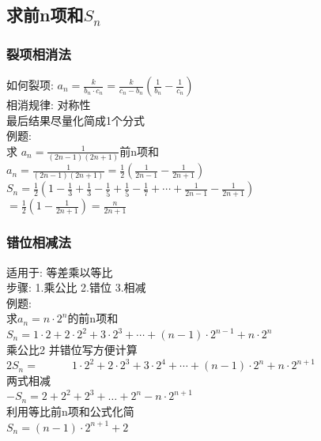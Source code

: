 \documentclass[hyperref, UTF8,11pt,a4paper]{ctexart} %
\begin{document}

\subsection{求前n项和\texorpdfstring{$S_{n}$}{Lg}}


\subsubsection{裂项相消法}

如何裂项: $a_{n}=\frac{k}{b_{n} \cdot c_{n}}=\frac{k}{c_{n}-b_{n}}\left(\frac{1}{b_{n}}-\frac{1}{c_{n}}\right)$ \\
相消规律: 对称性 \\
最后结果尽量化简成1个分式 \\

例题: \\
{\color{red}求 $a_{n}=\frac{1}{(2 n-1)(2 n+1)}$前n项和 }\\
$a_{n}=\frac{1}{(2 n-1)(2 n+1)}=\frac{1}{2}\left(\frac{1}{2 n-1}-\frac{1}{2 n+1}\right)$ \\
$S_{n}=\frac{1}{2}\left(1-\frac{1}{3}+\frac{1}{3}-\frac{1}{5}+\frac{1}{5}-\frac{1}{7}+\cdots+\frac{1}{2 n-1}-\frac{1}{2 n+1}\right)$ \\
$=\frac{1}{2}\left(1-\frac{1}{2 n+1}\right)=\frac{n}{2 n+1}$ \\


\subsubsection{错位相减法}
适用于: 等差乘以等比 \\
步骤: 1.乘公比 2.错位 3.相减 \\
例题: \\
{\color{red} 求$a_{n}=n \cdot 2^{n}$的前n项和 }\\
$S_{n} =1 \cdot 2+2 \cdot 2^{2}+3 \cdot 2^{3}+\cdots+(n-1) \cdot 2^{n-1}+n \cdot 2^{n}$ \\
乘公比2 并错位写方便计算\\
$2 S_{n}=\qquad \quad 1 \cdot 2^{2}+2 \cdot 2^{3}+3 \cdot 2^{4}+\cdots+(n-1) \cdot 2^{n}+n \cdot 2^{n+1}$ \\
两式相减 \\
$-S_{n}=2+2^{2}+2^{3}+\dots+2^{n}-n \cdot 2^{n+1}$ \\
利用等比前n项和公式化简 \\
$S_{n}=(n-1) \cdot 2^{n+1}+2$ \\
\end{document}
